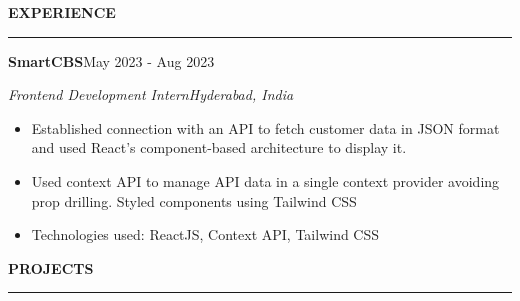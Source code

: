 \documentclass[a4paper,12pt]{report}
\begin{document}
 \par
 \vspace{9pt}
 
\noindent 
\textbf{EXPERIENCE} \par
\vspace{2pt}
\hrule
\vspace{6pt}


\noindent 
\textbf{SmartCBS}{\fontsize{9pt}{9pt}\selectfont \hfill  {\fontsize{12pt}{12pt}\selectfont May 2023 - Aug 2023}} \par
\noindent 
{\fontsize{12pt}{12pt}\selectfont \textit{Frontend Development Intern}\hfill\textit{Hyderabad, India}} \par
\noindent 
\begin{itemize}[noitemsep,topsep=0pt]
    \item {\fontsize{12pt}{12pt}\selectfont Established connection with an API to fetch customer data in JSON format and used React's component-based architecture to display it. } \par
    \noindent
    \item {\fontsize{12pt}{12pt}\selectfont Used context API to manage API data in a single context provider avoiding prop drilling. Styled components using Tailwind CSS} \par
    \noindent 
    \item {\fontsize{12pt}{12pt}\selectfont Technologies used: ReactJS, Context API, Tailwind CSS } \par
    \noindent
\end{itemize}



 \par
\vspace{9pt}



\noindent 
\textbf{PROJECTS} \par
\vspace{2pt}
\hrule
\vspace{6pt}
\end{document}
